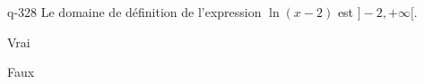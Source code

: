 \begin{truefalse}{q-328}
Le domaine de définition de l'expression $\ln(x-2)$ est $]-2,+\infty[$.
\item Vrai
\item* Faux
\end{truefalse}

